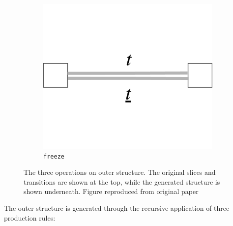 \documentclass[12pt,a4paper,twoside,openany]{report} \usepackage[pdfborder={0 0 0}]{hyperref}    %
\theoremstyle{definition} \newtheorem{definition}{Definition}[section]
\begin{document}
\begin{figure}[h]
\begin{subfigure}[t]{.20\textwidth}
    \includegraphics[keepaspectratio,width=\textwidth]{prep/outer/freeze} \caption{\texttt{freeze}}
    \label{fig:freezeOp} 
      \end{subfigure} 
    \centering 
    \captionsetup{width=.9\linewidth} 
    \caption{\small The three operations on outer structure. The original slices and transitions are shown at the top, while the generated structure is shown underneath. Figure reproduced from original paper \cite{finkensiepStructureFreePolyphony2023}}
\label{fig:outerOperations} 
\end{figure}

    The outer structure is generated through the recursive application of three production rules:
\end{document}
